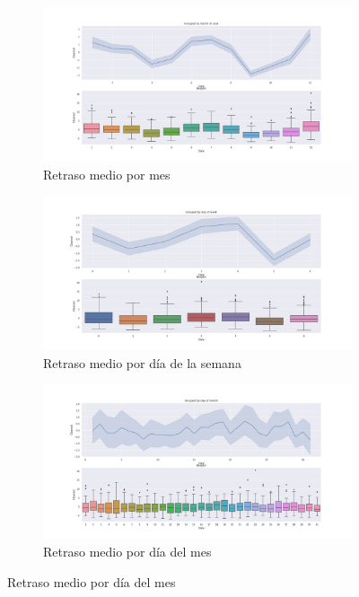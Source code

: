 \begin{figure}[hbtp]
\centering
\begin{subfigure}{.5\textwidth}
  \centering
  \includegraphics[width=\linewidth]{plots/within_year.png}
  \caption{Retraso medio por mes}
  \label{fig:within_year}
\end{subfigure}%
\begin{subfigure}{.5\textwidth}
    \centering
    \includegraphics[width=\linewidth]{plots/within_week.png}
    \caption{Retraso medio por d\'ia de la semana}
    \label{fig:within_week}
\end{subfigure}

\begin{subfigure}{.5\textwidth}
    \centering
  \includegraphics[width=\linewidth]{plots/within_month.png}
  \caption{Retraso medio por d\'ia del mes}
  \label{fig:within_month}
\end{subfigure}


\end{figure}


